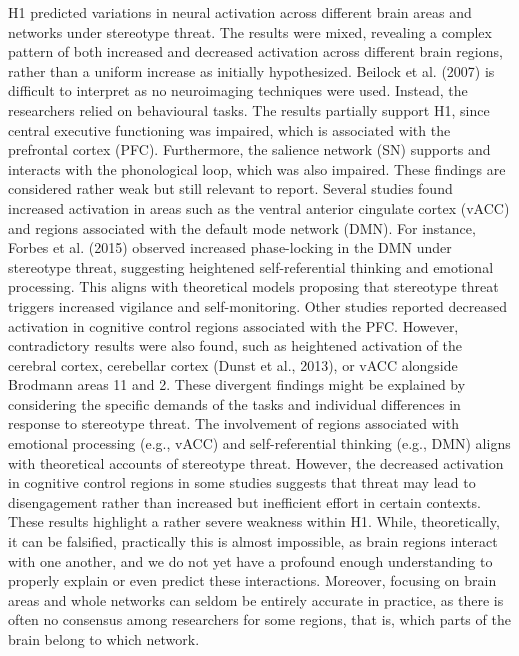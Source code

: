 \documentclass[
  stu, a4paper,floatsintext]{apa7}
\begin{document}
H1 predicted variations in neural activation across different brain areas and networks under stereotype threat.
The results were mixed, revealing a complex pattern of both increased and decreased activation across different brain regions, rather than a uniform increase as initially hypothesized.
Beilock et al. (2007) is difficult to interpret as no neuroimaging techniques were used.
Instead, the researchers relied on behavioural tasks.
The results partially support H1, since central executive functioning was impaired, which is associated with the prefrontal cortex (PFC).
Furthermore, the salience network (SN) supports and interacts with the phonological loop, which was also impaired. These findings are considered rather weak but still relevant to report.
Several studies found increased activation in areas such as the ventral anterior cingulate cortex (vACC) and regions associated with the default mode network (DMN).
For instance, Forbes et al. (2015) observed increased phase-locking in the DMN under stereotype threat, suggesting heightened self-referential thinking and emotional processing.
This aligns with theoretical models proposing that stereotype threat triggers increased vigilance and self-monitoring.
Other studies reported decreased activation in cognitive control regions associated with the PFC.
However, contradictory results were also found, such as heightened activation of the cerebral cortex, cerebellar cortex (Dunst et al., 2013), or vACC alongside Brodmann areas 11 and 2.
These divergent findings might be explained by considering the specific demands of the tasks and individual differences in response to stereotype threat.
The involvement of regions associated with emotional processing (e.g., vACC) and self-referential thinking (e.g., DMN) aligns with theoretical accounts of stereotype threat.
However, the decreased activation in cognitive control regions in some studies suggests that threat may lead to disengagement rather than increased but inefficient effort in certain contexts.\\
These results highlight a rather severe weakness within H1.
While, theoretically, it can be falsified, practically this is almost impossible, as brain regions interact with one another, and we do not yet have a profound enough understanding to properly explain or even predict these interactions.
Moreover, focusing on brain areas and whole networks can seldom be entirely accurate in practice, as there is often no consensus among researchers for some regions, that is, which parts of the brain belong to which network.
\end{document}

